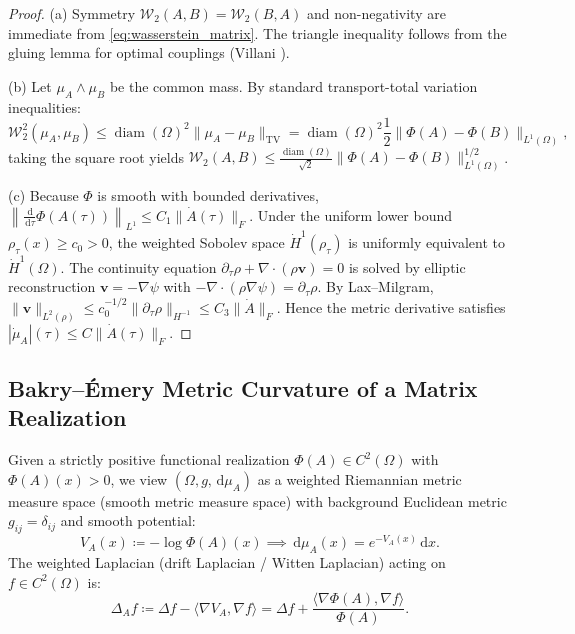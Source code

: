 \documentclass[11pt,a4paper,reqno]{amsart}
\theoremstyle{definition}
\numberwithin{equation}{section}
\newcommand{\dif}{\,\mathrm{d}}
\newcommand{\diam}{\operatorname{diam}}
\begin{document}
\begin{proof}
(a) Symmetry $\mathcal{W}_2(A, B) = \mathcal{W}_2(B, A)$ and non-negativity are immediate from \eqref{eq:wasserstein_matrix}. The triangle inequality follows from the gluing lemma for optimal couplings (Villani \cite{villani2009optimal}). 

(b) Let $\mu_A \wedge \mu_B$ be the common mass. By standard transport-total variation inequalities:
\begin{equation}
    \mathcal{W}_2^2(\mu_A, \mu_B) \le \diam(\Omega)^2 \|\mu_A - \mu_B\|_{\mathrm{TV}} = \diam(\Omega)^2 \frac{1}{2} \|\Phi(A) - \Phi(B)\|_{L^1(\Omega)},
\end{equation}
taking the square root yields $\mathcal{W}_2(A, B) \le \frac{\diam(\Omega)}{\sqrt{2}} \|\Phi(A) - \Phi(B)\|_{L^1(\Omega)}^{1/2}$.

(c) Because $\Phi$ is smooth with bounded derivatives, $\left\|\frac{\dif}{\dif \tau}\Phi(A(\tau))\right\|_{L^1} \le C_1 \|\dot{A}(\tau)\|_F$. Under the uniform lower bound $\rho_\tau(x) \ge c_0 > 0$, the weighted Sobolev space $\dot{H}^1(\rho_\tau)$ is uniformly equivalent to $\dot{H}^1(\Omega)$. The continuity equation $\partial_\tau \rho + \nabla \cdot (\rho \mathbf{v}) = 0$ is solved by elliptic reconstruction $\mathbf{v} = -\nabla \psi$ with $-\nabla \cdot (\rho \nabla \psi) = \partial_\tau \rho$. By Lax--Milgram, $\|\mathbf{v}\|_{L^2(\rho)} \le c_0^{-1/2} \|\partial_\tau \rho\|_{H^{-1}} \le C_3 \|\dot{A}\|_F$. Hence the metric derivative satisfies $|\dot{\mu}_A|(\tau) \le C \|\dot{A}(\tau)\|_F$.
\end{proof}

\subsection{Bakry--\'Emery Metric Curvature of a Matrix Realization}
Given a strictly positive functional realization $\Phi(A) \in C^2(\Omega)$ with $\Phi(A)(x) > 0$, we view $(\Omega, g, \dif \mu_A)$ as a weighted Riemannian metric measure space (smooth metric measure space) with background Euclidean metric $g_{ij} = \delta_{ij}$ and smooth potential:
\begin{equation}
    V_A(x) \coloneqq -\log \Phi(A)(x) \implies \dif \mu_A(x) = e^{-V_A(x)} \dif x.
\end{equation}
The weighted Laplacian (drift Laplacian / Witten Laplacian) acting on $f \in C^2(\Omega)$ is:
\begin{equation}
    \Delta_A f \coloneqq \Delta f - \langle \nabla V_A, \nabla f \rangle = \Delta f + \frac{\langle \nabla \Phi(A), \nabla f \rangle}{\Phi(A)}.
\end{equation}
\end{document}
